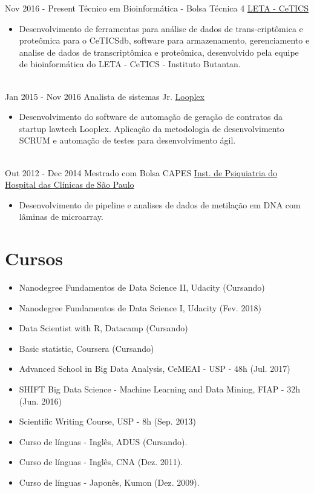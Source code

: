 \documentclass[letterpaper]{twentysecondcv} %
\begin{document}
\begin{twenty} %
\twentyitem
    	{Nov 2016 - }
		{Present}
        {Técnico em Bioinformática - Bolsa Técnica 4}
        {\href{http://cetics.butantan.gov.br/}{LETA - CeTICS}}
        {}
        {\begin{itemize}
        \item Desenvolvimento de ferramentas para análise de dados de trans-criptômica e proteômica para o CeTICSdb, software para armazenamento, gerenciamento e analise de dados de transcriptômica e proteômica, desenvolvido pela equipe de bioinformática do LETA - CeTICS - Instituto Butantan.
        \end{itemize}}
        \\
	\twentyitem
    	{Jan 2015 - }
		{Nov 2016}
        {Analista de sistemas Jr.}
        {\href{www.looplex.com.br/}{Looplex}}
        {}
        {
        {\begin{itemize}
        \item Desenvolvimento do software de automação de geração de contratos da startup lawtech Looplex. Aplicação da metodologia de desenvolvimento SCRUM e automação de testes para desenvolvimento ágil.
    \end{itemize}}
        }
    \\   
    \twentyitem
   		{Out 2012 - }
		{Dec 2014}
        {Mestrado com Bolsa CAPES }
        {\href{www.ipqhc.org.br}{ Inst. de Psiquiatria do Hospital das Clínicas de São Paulo}}
        {}
        {
        {\begin{itemize}
        \item Desenvolvimento de pipeline e analises de dados de metilação em DNA com lâminas de microarray.
    \end{itemize}}
        }       
\end{twenty}

\section{Cursos}
\begin{itemize}
	\item Nanodegree Fundamentos de Data Science II, Udacity (Cursando)
	\item Nanodegree Fundamentos de Data Science I, Udacity (Fev. 2018)
	\item Data Scientist with R, Datacamp (Cursando) 
	\item Basic statistic, Coursera (Cursando)
	\item Advanced School in Big Data Analysis, CeMEAI - USP - 48h (Jul. 2017)
	\item SHIFT Big Data Science - Machine Learning and Data Mining, FIAP - 32h (Jun. 2016)
	\item Scientific Writing Course, USP - 8h (Sep. 2013)
	\item Curso de línguas - Inglês, ADUS (Cursando).
	\item Curso de línguas - Inglês, CNA (Dez. 2011).
	\item Curso de línguas - Japonês, Kumon (Dez. 2009).
\end{itemize}
\end{document}
